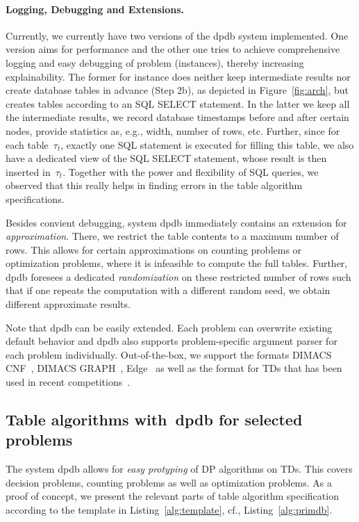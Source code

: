 \documentclass{llncs}
\newcommand{\dpdb}{{\small\textsf{dpdb}}\xspace}
\newcommand{\tab}[1]{\ensuremath{\tau_{#1}}}
\begin{document}
\paragraph*{Logging, Debugging and Extensions.} Currently, we currently have two versions of the \dpdb system implemented. 
One version aims for performance and the other one tries to achieve comprehensive logging and easy debugging of problem (instances), thereby increasing explainability.
The former for instance does neither keep intermediate results 
nor create database tables in advance (Step 2b),
as depicted in Figure~\ref{fig:arch}, but creates tables according 
to an SQL {\ttfamily SELECT} statement.
In the latter we keep all the intermediate results, we record database timestamps before and after certain nodes, provide statistics as, e.g., width, number of rows, etc.
Further, since for each table~$\tab{t}$, exactly one SQL statement is executed for filling this table, we also have a dedicated view of the SQL {\ttfamily SELECT} statement, whose result is then inserted in~$\tab{t}$.
Together with the power and flexibility of SQL queries, we observed that this really helps in finding errors in the table algorithm specifications.

Besides convient debugging, system \dpdb immediately
contains an extension for \emph{approximation}.
There, we restrict the table contents to a maximum number of rows.
This allows for certain approximations on counting problems or
optimization problems, where it is infeasible to compute the full tables.
Further, \dpdb foresees a dedicated \emph{randomization} on these restricted number of rows
such that if one repeats the computation with a different random seed,
we obtain different approximate results.

Note that \dpdb can be easily extended. 
Each problem can overwrite existing default behavior and \dpdb also supports
problem-specific argument parser for each problem individually.
Out-of-the-box, we support the formats DIMACS CNF~\cite{}, DIMACS GRAPH~\cite{}, Edge~\cite{} as well as the format for TDs that has been used in recent competitions~\cite{}.


\subsection{Table algorithms with~\dpdb for selected problems}

The system \dpdb allows for \emph{easy protyping} of DP algorithms on TDs.
This covers decision problems, counting problems as well as optimization problems.
As a proof of concept, we present the relevant parts of table algorithm specification
according to the template in Listing~\ref{alg:template}, cf., Listing~\ref{alg:primdb}.
\end{document}
